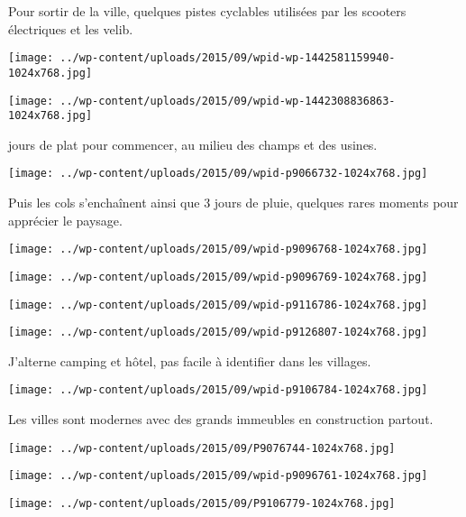  Pour sortir de la ville, quelques pistes cyclables utilisées par les scooters électriques et les velib.
\begin{center} \texttt{[image: ../wp-content/uploads/2015/09/wpid-wp-1442581159940-1024x768.jpg]} \end{center}
\begin{center} \texttt{[image: ../wp-content/uploads/2015/09/wpid-wp-1442308836863-1024x768.jpg]} \end{center}

 jours de plat pour commencer, au milieu des champs et des usines.
\begin{center} \texttt{[image: ../wp-content/uploads/2015/09/wpid-p9066732-1024x768.jpg]} \end{center}

 Puis les cols s'enchaînent ainsi que 3 jours de pluie, quelques rares moments pour apprécier le paysage.
\begin{center} \texttt{[image: ../wp-content/uploads/2015/09/wpid-p9096768-1024x768.jpg]} \end{center}
\begin{center} \texttt{[image: ../wp-content/uploads/2015/09/wpid-p9096769-1024x768.jpg]} \end{center}
\begin{center} \texttt{[image: ../wp-content/uploads/2015/09/wpid-p9116786-1024x768.jpg]} \end{center}
\begin{center} \texttt{[image: ../wp-content/uploads/2015/09/wpid-p9126807-1024x768.jpg]} \end{center}

 J'alterne camping et hôtel, pas facile à identifier dans les villages.
\begin{center} \texttt{[image: ../wp-content/uploads/2015/09/wpid-p9106784-1024x768.jpg]} \end{center}

\pagebreak
 Les villes sont modernes avec des grands immeubles en construction partout.
\begin{center} \texttt{[image: ../wp-content/uploads/2015/09/P9076744-1024x768.jpg]} \end{center}
\begin{center} \texttt{[image: ../wp-content/uploads/2015/09/wpid-p9096761-1024x768.jpg]} \end{center}
\begin{center} \texttt{[image: ../wp-content/uploads/2015/09/P9106779-1024x768.jpg]} \end{center}

